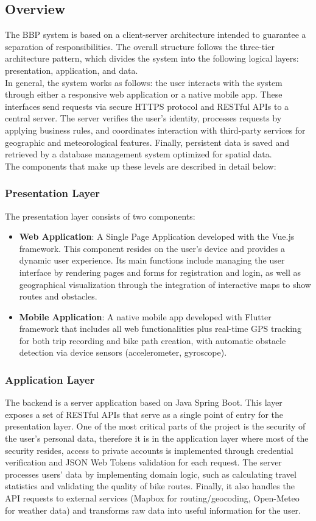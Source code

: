\subsection{Overview}
The BBP system is based on a client-server architecture intended to guarantee a separation of responsibilities. The overall structure follows the three-tier architecture pattern, which divides the system into the following logical layers: presentation, application, and data. \\
In general, the system works as follows: the user interacts with the system through either a responsive web application or a native mobile app. These interfaces send requests via secure HTTPS protocol and RESTful APIs to a central server. The server verifies the user's identity, processes requests by applying business rules, and coordinates interaction with third-party services for geographic and meteorological features. Finally, persistent data is saved and retrieved by a database management system optimized for spatial data. \\
The components that make up these levels are described in detail below:

\subsubsection{Presentation Layer}
The presentation layer consists of two components:
\begin{itemize}
    \item \textbf{Web Application}: A Single Page Application developed with the Vue.js framework. This component resides on the user's device and provides a dynamic user experience. Its main functions include managing the user interface by rendering pages and forms for registration and login, as well as geographical visualization through the integration of interactive maps to show routes and obstacles.
    \item \textbf{Mobile Application}: A native mobile app developed with Flutter framework that includes all web functionalities plus real-time GPS tracking for both trip recording and bike path creation, with automatic obstacle detection via device sensors (accelerometer, gyroscope).
\end{itemize}

\subsubsection{Application Layer}
The backend is a server application based on Java Spring Boot. This layer exposes a set of RESTful APIs that serve as a single point of entry for the presentation layer. One of the most critical parts of the project is the security of the user's personal data, therefore it is in the application layer where most of the security resides, access to private accounts is implemented through credential verification and JSON Web Tokens validation for each request. The server processes users' data by implementing domain logic, such as calculating travel statistics and validating the quality of bike routes. Finally, it also handles the API requests to external services (Mapbox for routing/geocoding, Open-Meteo for weather data) and transforms raw data into useful information for the user.


